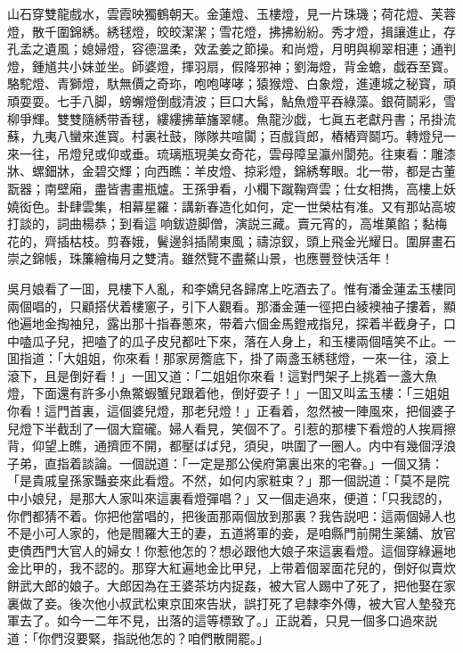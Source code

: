\begin{myquote}
山石穿雙龍戲水，雲霞映獨鶴朝天。金蓮燈、玉樓燈，見一片珠璣；荷花燈、芙蓉燈，散千圍錦綉。綉毬燈，皎皎潔潔；雪花燈，拂拂紛紛。秀才燈，揖讓進止，存孔孟之遺風；媳婦燈，容德溫柔，效孟姜之節操。和尚燈，月明與柳翠相連；通判燈，鍾馗共小妹並坐。師婆燈，揮羽扇，假降邪神；劉海燈，背金蟾，戯吞至寳。駱駝燈、青獅燈，馱無價之奇珎，咆咆哮哮；猿猴燈、白象燈，進連城之秘寳，頑頑耍耍。七手八脚，螃蠏燈倒戲清波；巨口大髯，鮎魚燈平吞綠藻。銀荷鬬彩，雪柳爭輝。雙雙隨綉带香毬，縷縷拂華旛翠幰。魚龍沙戯，七眞五老獻丹書；吊掛流蘇，九夷八蠻來進寳。村裏社鼓，隊隊共喧闐；百戲貨郎，樁樁齊鬬巧。轉燈兒一來一往，吊燈兒或仰或垂。琉璃瓶現美女奇花，雲母障呈瀛州閬苑。往東看：雕漆牀、螺鈿牀，金碧交輝；向西瞧：羊皮燈、掠彩燈，錦綉奪眼。北一带，都是古董翫器；南壁廂，盡皆書畫瓶爐。王孫爭看，小欄下蹴鞠齊雲；仕女相擕，高樓上妖嬈衒色。卦肆雲集，相幕星羅：講新春造化如何，定一世榮枯有准。又有那站高坡打談的，詞曲楊恭；到看這𢵞响鈸遊脚僧，演説三藏。賣元宵的，高堆菓餡；黏梅花的，齊插枯枝。剪春娥，鬢邊斜插鬧東風；禱涼釵，頭上飛金光耀日。圍屏畫石崇之錦帳，珠簾繪梅月之雙清。雖然覽不盡鰲山景，也應豐登快活年！
\end{myquote}

吳月娘看了一囬，見樓下人亂，和李嬌兒各歸席上吃酒去了。惟有潘金蓮孟玉樓同兩個唱的，只顧搭伏着樓窻子，引下人觀看。那潘金蓮一徑把白綾襖袖子摟着，顯他遍地金掏袖兒，露出那十指春蔥來，带着六個金馬鐙戒指兒，探着半截身子，口中嗑瓜子兒，把嗑了的瓜子皮兒都吐下來，落在人身上，和玉樓兩個嘻笑不止。一囬指道：「大姐姐，你來看！那家房簷底下，掛了兩盞玉綉毬燈，一來一往，滾上滾下，且是倒好看！」一囬又道：「二姐姐你來看！這對門架子上挑着一盞大魚燈，下面還有許多小魚鱉蝦蟹兒跟着他，倒好耍子！」一囬又叫孟玉樓：「三姐姐你看！這門首裏，這個婆兒燈，那老兒燈！」正看着，忽然被一陣風來，把個婆子兒燈下半截刮了一個大窟礲。婦人看見，笑個不了。引惹的那樓下看燈的人挨肩擦背，仰望上瞧，通擠匝不開，都壓ばば兒，須臾，哄圍了一圈人。内中有幾個浮浪子弟，直指着談論。一個説道：「一定是那公侯府第裏出來的宅眷。」一個又猜：「是貴戚皇孫家豔妾來此看燈。不然，如何内家粧束？」那一個説道：「莫不是院中小娘兒，是那大人家叫來這裏看燈彈唱？」又一個走過來，便道：「只我認的，你們都猜不着。你把他當唱的，把後面那兩個放到那裏？我告説吧：這兩個婦人也不是小可人家的，他是閻羅大王的妻，五道將軍的妾，是咱縣門前開生薬舖、放官吏債西門大官人的婦女！你惹他怎的？想必跟他大娘子來這裏看燈。這個穿綠遍地金比甲的，我不認的。那穿大紅遍地金比甲兒，上带着個翠面花兒的，倒好似賣炊餅武大郎的娘子。大郎因為在王婆茶坊内捉姦，被大官人踢中了死了，把他娶在家裏做了妾。後次他小叔武松東京囬來告狀，誤打死了皂隸李外傳，被大官人墊發充軍去了。如今一二年不見，出落的這等標致了。」正説着，只見一個多口過來説道：「你們沒要緊，指説他怎的？咱們散開罷。」

